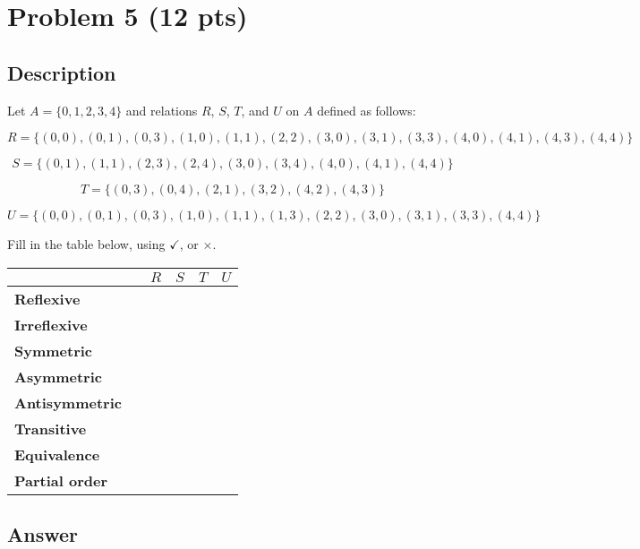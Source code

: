 \newpage

\section{Problem 5 (12 pts)}
\subsection{Description}

\noindent Let $A = \{ 0, 1, 2, 3, 4 \}$ and relations $R$, $S$, $T$, and $U$ on $A$ defined as follows:

\[ R = \{ (0, 0),  (0, 1),  (0, 3),  (1, 0),  (1, 1),  (2, 2),  (3, 0),  (3, 1), (3, 3), (4, 0), (4, 1), (4, 3), (4, 4)  \}\]

\[ S = \{ (0, 1),  (1, 1),  (2, 3),  (2, 4), (3, 0), (3, 4), (4, 0), (4, 1), (4, 4)  \}\]

\[ T = \{ (0, 3), (0, 4),  (2, 1), (3, 2), (4, 2), (4, 3) \}\]

\[ U = \{ (0, 0),  (0, 1), (0, 3), (1, 0), (1, 1), (1, 3), (2, 2), (3, 0), (3, 1), (3, 3), (4, 4) \}\]

\noindent Fill in the table below, using $\checkmark$, or $\times$.

\begin{center}
\begin{tabular}{|l|l|l|l|l|l|}
\hline
						&	&	$R$	&	$S$	&	$T$	& $U$\\
\hline
\textbf{Reflexive} 	&   &		&		&	&	 \\
\hline
\textbf{Irreflexive} 	&   &		&		&	&	 \\
\hline
\textbf{Symmetric} 	&   &		&		&	&	 \\
\hline
\textbf{Asymmetric} 	&   &		&		&	&	 \\
\hline
\textbf{Antisymmetric} &   &		&		&	&	 \\
\hline
\textbf{Transitive} 	&   &		&		&	&	 \\
\hline
\textbf{Equivalence} 	&   &		&		&	&	 \\
\hline
\textbf{Partial order} 	&   &		&		&	&	 \\
\hline
\end{tabular}
\end{center}
\subsection{Answer}
